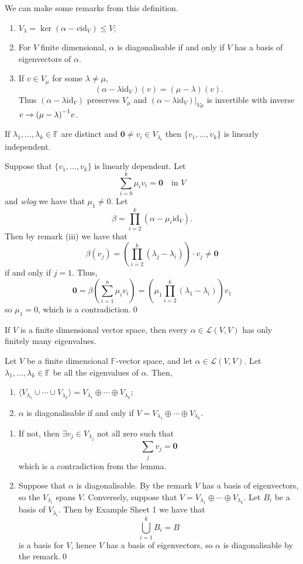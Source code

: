 \documentclass{article}
\newcommand{\F}{\mathbb{F}}
\renewcommand{\id}{\mathrm{id}}
\begin{document}
\begin{remark}
	We can make some remarks from this definition.
  \begin{enumerate}
	  \item $ V_\lambda=\ker(\alpha-v\id_V)\le V $;
	  \item For $ V $ finite dimensional, $ \alpha $ is diagonalisable if and only if $ V $ has a basis of eigenvectors of $ \alpha $.
	  \item If $ v\in V_\mu $ for some $ \lambda\ne\mu $,
		  \[
			  (\alpha-\lambda\id_V)(v)=(\mu-\lambda)(v).
		  \]
		  Thus $ (\alpha-\lambda\id_V) $ preserves $ V_\mu $ and $ (\alpha-\lambda\id_V)|_{V\mu} $ is invertible with inverse $ v\to {(\mu-\lambda)}^{-1}v $.
  \end{enumerate}
\end{remark}
\begin{lemma}
	If $ \lambda_1,\dots, \lambda_k\in\F $ are distinct and $ \mathbf 0 \ne v_i\in V_{\lambda_i} $ then $ \{v_1,\dots, v_k\} $ is linearly independent.
\end{lemma}
\pf Suppose that $ \{v_1,\dots, v_k\} $ is linearly dependent. Let
\[
	\sum_{i=0}^k\mu_iv_i=\mathbf 0\quad\text{in } V
\]
and \textit{wlog} we have that $ \mu_1\ne 0 $. Let
\[
	\beta=\prod_{i=2}^k(\alpha-\mu_i\id_V).
\]
Then by remark (iii) we have that
\[
	\beta(v_j)=\left(\prod_{i=2}^k(\lambda_j-\lambda_i)\right)\cdot v_j\ne \mathbf 0
\]
if and only if $ j=1 $. Thus,
\[
	\mathbf 0 = \beta\left(\sum_{i=1}^n\mu_iv_i\right)=\left(\mu_1\prod_{i=2}^k(\lambda_1-\lambda_i)\right)v_1
\]
so $ \mu_1=0 $, which is a contradiction.\qed
\begin{corollary}
  If $ V $ is a finite dimensional vector space, then every $ \alpha\in\mathcal L(V,V) $ has only finitely many eigenvalues.
\end{corollary}
\begin{proposition}
  Let $ V $ be a finite dimensional $ \F $-vector space, and let $ \alpha\in\mathcal L(V,V) $. Let $ \lambda_1,\dots, \lambda_k\in\F $ be all the eigenvalues of $ \alpha $. Then,
  \begin{enumerate}
	  \item $ \langle V_{\lambda_1}\cup \cdots \cup V_{\lambda_k}\rangle= V_{\lambda_1}\oplus \cdots \oplus V_{\lambda_k} $;
	  \item $ \alpha $ is diagonalisable if and only if $ V=V_{\lambda_1}\oplus \cdots \oplus V_{\lambda_k} $.
  \end{enumerate}
\end{proposition}
\pf 
\begin{enumerate}
	\item If not, then $ \exists v_j\in V_{\lambda_j} $ not all zero such that
		\[
		  \sum_jv_j=\mathbf 0
		\]
		which is a contradiction from the lemma.
	\item Suppose that $ \alpha $ is diagonalisable. By the remark $ V $ has a basis of eigenvectors, so the $ V_{\lambda_i} $ spans $ V $. Conversely, suppose that $ V=V_{\lambda_1}\oplus \cdots \oplus V_{\lambda_k} $. Let $ B_i $ be a basis of $ V_{\lambda_i} $. Then by Example Sheet 1 we have that
		\[
			\bigcup_{i=1}^k B_i=B
		\]
		is a basis for $ V $, hence $ V $ has a basis of eigenvectors, so $ \alpha $ is diagonalisable by the remark.\qed
\end{enumerate}
\end{document}
